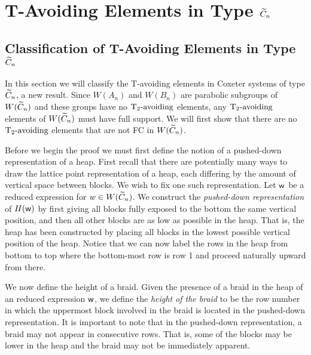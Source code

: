 \chapter{T-Avoiding Elements in Type $\widetilde{C}_n$}\label{chap:Cn}



\section{Classification of T-Avoiding Elements in Type $\widetilde{C}_n$}\label{sec:TAC}

In this section we will classify the T-avoiding elements in Coxeter systems of type $\widetilde{C}_n$, a new result. Since $W(A_n)$ and $W(B_n)$ are parabolic subgroups of $W(\widetilde{C}_n)$ and these groups have no $\operatorname{T_2-\mathrm{avoiding}}$ elements,  any $\operatorname{T_2-\mathrm{avoiding}}$ elements of $W(\widetilde{C}_n)$ must have full support. We will first show that there are no $\operatorname{T_2-\mathrm{avoiding}}$ elements that are not FC in $W(\widetilde{C}_n)$.

Before we begin the proof we must first define the notion of a pushed-down representation of a heap. First recall that there are potentially many ways to draw the lattice point representation of a heap, each differing by the amount of vertical space between blocks. We wish to fix one such representation. Let $\mathsf{w}$ be a reduced expression for $w \in W(\widetilde{C}_n)$. We construct the \emph{pushed-down representation} of $H(\mathsf{w})$ by first giving all blocks fully exposed to the bottom the same vertical position, and then all other blocks are as low as possible in the heap. That is, the heap has been constructed by placing all blocks in the lowest possible vertical position of the heap. Notice that we can now label the rows in the heap from bottom to top where the bottom-most row is row 1 and proceed naturally upward from there. 

We now define the height of a braid. Given the presence of a braid in the heap of an reduced expression $\mathsf{w}$, we define the \emph{height of the braid} to be the row number in which the uppermost block involved in the braid is located in the pushed-down representation. It is important to note that in the pushed-down representation, a braid may not appear in consecutive rows. That is, some of the blocks may be lower in the heap and the braid may not be immediately apparent. 

